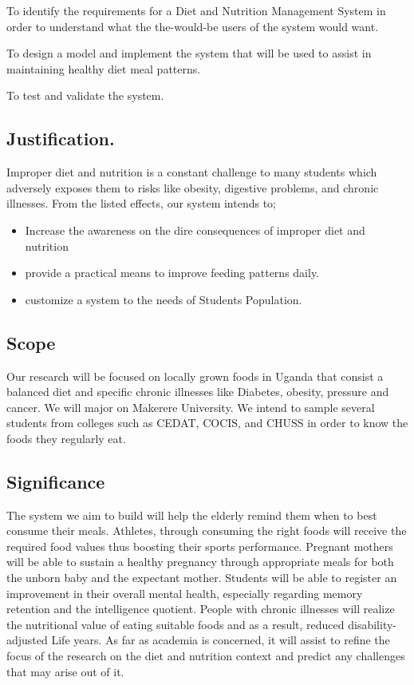 \documentclass{article}
\begin{document}
To identify the requirements for a Diet and Nutrition Management System in order to understand what the the-would-be users of the system would want.

To design a model and implement the system that will be used to assist in maintaining healthy diet meal patterns.

To test and validate the system.  

\subsection{Justification.}
Improper diet and nutrition is a constant challenge to many students which adversely exposes them to risks like obesity, digestive problems, and chronic illnesses. From the listed effects, our system intends to; 
\begin{itemize}
  \item Increase the awareness on the dire consequences of improper diet and nutrition
  \item provide a practical means to improve feeding patterns daily. 
  \item customize a system to the needs of Students Population. 

\end{itemize}

\subsection{Scope}
Our research will be focused on locally grown foods in Uganda that consist a balanced diet and specific chronic illnesses like Diabetes, obesity, pressure and cancer. We will major on Makerere University. We intend to sample several students from colleges such as CEDAT, COCIS, and CHUSS in order to know the foods they regularly eat.

\subsection{Significance}
The system we aim to build will help the elderly remind them when to best consume their meals. Athletes, through consuming the right foods will receive the required food values thus boosting their sports performance. Pregnant mothers will be able to sustain a healthy pregnancy through appropriate meals for both the unborn baby and the expectant mother. Students will be able to register an improvement in their overall mental health, especially regarding memory retention and the intelligence quotient.  People with chronic illnesses will realize the nutritional value of eating suitable foods and as a result, reduced disability-adjusted Life years. As far as academia is concerned, it will assist to refine the focus of the research on the diet and nutrition context and predict any challenges that may arise out of it.
\end{document}
